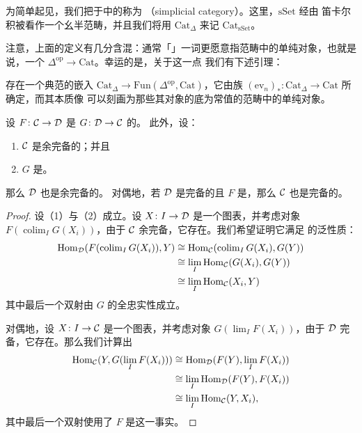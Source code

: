 \begin{definition}\label{def:simplicial-category}
为简单起见，我们把\trEnrichment{}于\trSimplicialSets{}中的\trCategory{}称为%
\emph{\trSimplicialCategory{}}（simplicial category）。这里，$\mathrm{sSet}$ 经由
笛卡尔积被看作一个幺半范畴，并且我们将用 $\mathrm{Cat}_{\Delta}$ 来记
$\mathrm{Cat}_{\mathrm{sSet}}$。
\end{definition}

\begin{remark}\label{rem:simplicial-category-ambiguity}
注意，上面的定义有几分含混：通常「\trSimplicialCategory{}」一词更愿意指范畴中的单纯对象，也就是
说，一个\trFunctor{} $\Delta^{\mathrm{op}} \to \mathrm{Cat}$。幸运的是，关于这一点
我们有下述引理：
\end{remark}

\begin{lemma}\label{lem:cat-delta-embedding}
存在一个典范的\trFullyFaithful{}嵌入 $\mathrm{Cat}_{\Delta} \to \mathrm{Fun}(\Delta^{\mathrm{op}}, \mathrm{Cat})$，它由\trFunctor{}族
$(\mathrm{ev}_n)_*\colon \mathrm{Cat}_{\Delta} \to \mathrm{Cat}$ 所确定，而其本质像
可以刻画为那些其对象的底\trSimplicialSet{}为常值的范畴中的单纯对象。
\end{lemma}

\begin{lemma}\label{lem:cocomplete-left-adjoint}
设 $F\colon \mathcal{C} \to \mathcal{D}$ 是 $G\colon \mathcal{D} \to \mathcal{C}$ 的\trLeftAdjoint{}。
此外，设：
\begin{enumerate}[label=(\arabic*)]
  \item $\mathcal{C}$ 是余完备的；并且
  \item $G$ 是\trFullyFaithful{}。
\end{enumerate}
那么 $\mathcal{D}$ 也是余完备的。
对偶地，若 $\mathcal{D}$ 是完备的且 $F$ 是\trFullyFaithful{}，那么 $\mathcal{C}$ 也是完备的。
\end{lemma}

\begin{proof}
设（1）与（2）成立。设 $X\colon I \to \mathcal{D}$ 是一个图表，并考虑对象
$F(\operatorname{colim}_I G(X_i))$，由于 $\mathcal{C}$ 余完备，它存在。我们希望证明它满足%
\trColimit{}的泛性质：
\[
\begin{aligned}
\mathrm{Hom}_{\mathcal{D}}(F(\operatorname{colim}_I G(X_i)), Y)
&\cong \mathrm{Hom}_{\mathcal{C}}(\operatorname{colim}_I G(X_i), G(Y))\\
&\cong \lim_I \mathrm{Hom}_{\mathcal{C}}(G(X_i), G(Y))\\
&\cong \lim_I \mathrm{Hom}_{\mathcal{C}}(X_i, Y)
\end{aligned}
\]
其中最后一个双射由 $G$ 的全忠实性成立。

对偶地，设 $X\colon I \to \mathcal{C}$ 是一个图表，并考虑对象 $G(\lim_I F(X_i))$，由于
$\mathcal{D}$ 完备，它存在。那么我们计算出
\[
\begin{aligned}
\mathrm{Hom}_{\mathcal{C}}(Y, G(\lim_I F(X_i)))
&\cong \mathrm{Hom}_{\mathcal{D}}(F(Y), \lim_I F(X_i))\\
&\cong \lim_I \mathrm{Hom}_{\mathcal{D}}(F(Y), F(X_i))\\
&\cong \lim_I \mathrm{Hom}_{\mathcal{C}}(Y, X_i),
\end{aligned}
\]
其中最后一个双射使用了 $F$ 是\trFullyFaithful{}这一事实。
\end{proof}

